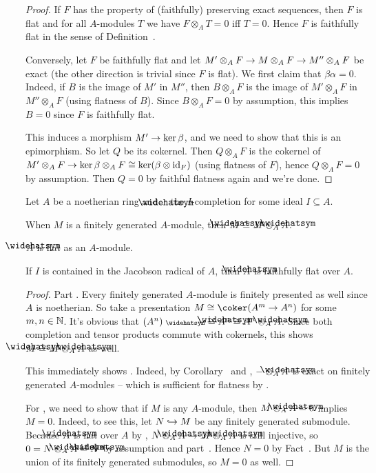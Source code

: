 \documentclass[a4paper,parskip=half,numbers=enddot, DIV=12]{scrreprt}
\begin{document}
\begin{proof}
	If $F$ has the property of (faithfully) preserving exact sequences, then $F$ is flat and for all $A$-modules $T$ we have $F\otimes_AT= 0$ iff $T=0$. Hence $F$ is faithfully flat in the sense of Definition~.
	
	Conversely, let $F$ be faithfully flat and let $M'\otimes_AF\morphism M\otimes_AF\morphism M''\otimes_AF$ be exact (the other direction is trivial since $F$ is flat). We first claim that $\beta\alpha=0$. Indeed, if $B$ is the image of $M'$ in $M''$, then $B\otimes_AF$ is the image of $M'\otimes_AF$ in $M''\otimes_AF$ (using flatness of $B$). Since $B\otimes_AF=0$ by assumption, this implies $B=0$ since $F$ is faithfully flat.
	
	This induces a morphism $M'\morphism\ker\beta$, and we need to show that this is an epimorphism. So let $Q$ be its cokernel. Then $Q\otimes_AF$ is the cokernel of $M'\otimes_AF\morphism\ker\beta\otimes_AF\cong \ker(\beta\otimes\id_F)$ (using flatness of $F$), hence $Q\otimes_AF=0$ by assumption. Then $Q=0$ by faithful flatness again and we're done.
\end{proof}
\begin{cor}
	Let $A$ be a noetherian ring and $\roof{\phantom{x}}$ the $I$-completion for some ideal $I\subseteq A$.
	\begin{alphanumerate}
		\item When $M$ is a finitely generated $A$-module, then $\roof{M}\cong M\otimes_A\roof{A}$.
		\item $\roof{A}$ is flat as an $A$-module.
		\item If $I$ is contained in the Jacobson radical of $A$, then $\roof{A}$ is faithfully flat over $A$.
	\end{alphanumerate}
\end{cor}
\begin{proof}
	Part . Every finitely generated $A$-module is finitely presented as well since $A$ is noetherian. So take a presentation $M\cong \coker(A^m\morphism A^n)$ for some $m,n\in\mathbb{N}$. It's obvious that $(A^n)^\complete\cong \roof{A}^n\cong A^n\otimes_A\roof{A}$. Since both completion and tensor products commute with cokernels, this shows $\roof{M}\cong M\otimes_A\roof{A}$ as well.
	
	This immediately shows . Indeed, by Corollary~ and , $-\otimes_A\roof{A}$ is exact on finitely generated $A$-modules -- which is sufficient for flatness by \cite[Proposition~1.2.2]{homalg}.
	
	For , we need to show that if $M$ is any $A$-module, then $M\otimes_A\roof{A}=0$ implies $M=0$. Indeed, to see this, let $N\monomorphism M$ be any finitely generated submodule. Because $\roof{A}$ is flat over $A$ by , $N\otimes_A\roof{A}\morphism M\otimes_A\roof{A}$ is still injective, so $0=N\otimes_A\roof{A}=\roof{N}$ by assumption and part~. Hence $N=0$ by Fact~. But $M$ is the union of its finitely generated submodules, so $M=0$ as well.
\end{proof}
\end{document}
